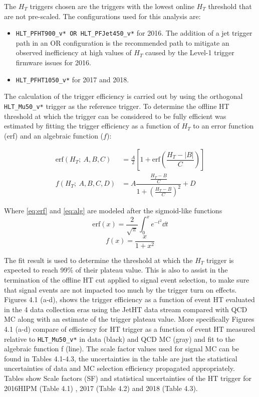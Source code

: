 The $H_T$ triggers chosen are the triggers with the lowest online $H_T$ threshold that are not pre-scaled. The configurations used for this analysis are:

\begin{itemize}
	\item \verb|HLT_PFHT900_v* OR HLT_PFJet450_v*| for 2016. The addition of a jet trigger path in an OR configuration is the recommended path to mitigate an observed inefficiency at high values of $H_T$ caused by the Level-1 trigger firmware issues for 2016.
	\item \verb|HLT_PFHT1050_v*| for 2017 and 2018.
\end{itemize}

The calculation of the trigger efficiency is carried out by using the orthogonal \verb|HLT_Mu50_v*| trigger as the reference trigger. To determine the offline HT threshold at which the trigger can be considered to be fully efficient was estimated by fitting the trigger efficiency as a function of $H_T$ to an error function (erf) and an algebraic function ($f$):

\begin{align}
	\text{erf}(H_T ;\ A,B,C) & = \frac A2 \left[1+ \text{erf}\left(\dfrac{H_T - |B|}{C}\right) \right]\label{eq:erf} \\
	f(H_T ;\ A,B,C,D)        & = A \dfrac{\frac{H_T - B}{C}}{1+ \left(\frac{H_T - B}{C}\right)^2} + D \label{eq:alg}
\end{align}

Where \eqref{eq:erf} and \eqref{eq:alg} are modeled after the sigmoid-like functions
\[
	\text{erf}(x) = \frac{2}{\sqrt{\pi}} \int_0^x e^{-t^2} \dd{t}
\]
\[
	f(x)=\frac{x}{1+x^{2}}
\]


The fit result is used to determine the threshold at which the $H_T$ trigger is expected to reach 99\% of their plateau value. This is also to assist in the termination of the offline HT cut applied to signal event selection, to make sure that signal events are not impacted too much by the trigger turn on effects. Figures 4.1 (a-d), shows the trigger efficiency as a function of event HT evaluated in the 4 data collection eras using the JetHT data stream compared with QCD MC along with an estimate of the trigger plateau value.
More specifically Figures 4.1 (a-d) compare of efficiency for HT trigger as a function of event HT measured relative to \verb|HLT_Mu50_v*| in data (black) and QCD MC (gray) and fit to the algebraic function f (line). The scale factor values used for signal MC can be found in Tables 4.1-4.3, the uncertainties in the table are just the statistical uncertainties of data and MC selection efficiency propagated appropriately. Tables show Scale factors (SF) and statistical uncertainties of the HT trigger for 2016HIPM (Table 4.1) , 2017  (Table 4.2) and 2018 (Table 4.3).


